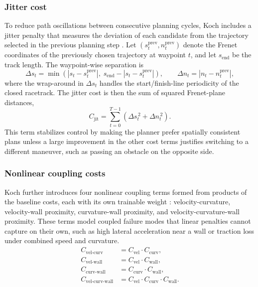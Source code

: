 \subsubsection{Jitter cost}
To reduce path oscillations between consecutive planning cycles, Koch includes a jitter penalty that measures the deviation of each candidate from the trajectory selected in the previous planning step \cite{koch_DifferentiableInterpretablePath_2025}.
Let $(s^{\text{prev}}_t, n^{\text{prev}}_t)$ denote the Frenet coordinates of the previously chosen trajectory at waypoint $t$, and let $s_{\text{end}}$ be the track length. The waypoint-wise separation is
\begin{equation}
    \Delta s_t = \min\!\left(|s_t - s^{\text{prev}}_t|,\; s_{\text{end}} - |s_t - s^{\text{prev}}_t|\right), \qquad \Delta n_t = |n_t - n^{\text{prev}}_t|,
\end{equation}
where the wrap-around in $\Delta s_t$ handles the start/finish-line periodicity of the closed racetrack.
The jitter cost is then the sum of squared Frenet-plane distances,
\begin{equation}
    C_{\text{jit}} = \sum_{t=0}^{T-1} \left(\Delta s_t^{\,2} + \Delta n_t^{\,2}\right).
\end{equation}
This term stabilizes control by making the planner prefer spatially consistent plans unless a large improvement in the other cost terms justifies switching to a different maneuver, such as passing an obstacle on the opposite side.

\subsubsection{Nonlinear coupling costs}
Koch further introduces four nonlinear coupling terms formed from products of the baseline costs, each with its own trainable weight \cite{koch_DifferentiableInterpretablePath_2025}:
velocity-curvature, velocity-wall proximity, curvature-wall proximity, and velocity-curvature-wall proximity.
These terms model coupled failure modes that linear penalties cannot capture on their own, such as high lateral acceleration near a wall or traction loss under combined speed and curvature.
\begin{align}
    C_{\text{vel-curv}} &= C_{\text{vel}} \cdot C_{\text{curv}}, \\
    C_{\text{vel-wall}} &= C_{\text{vel}} \cdot C_{\text{wall}}, \\
    C_{\text{curv-wall}} &= C_{\text{curv}} \cdot C_{\text{wall}}, \\
    C_{\text{vel-curv-wall}} &= C_{\text{vel}} \cdot C_{\text{curv}} \cdot C_{\text{wall}}.
    \label{eq:nonlinearCouplingCosts}
\end{align}

